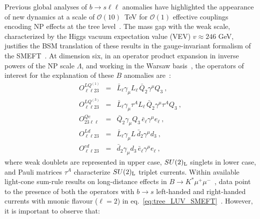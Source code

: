 Previous global analyses of $b \to s \ell \ell$ anomalies have highlighted the appearance of new dynamics at a scale of $\mathcal{O}(10)$~TeV for $\mathcal{O}(1)$ effective couplings encoding NP effects at the tree level~\cite{DAmico:2017mtc,Geng:2017svp,Capdevila:2017bsm,Ciuchini:2017mik,Hiller:2017bzc}. The mass gap with the weak scale, characterized by the Higgs vacuum expectation value (VEV) $v \approx 246$ GeV, justifies the BSM translation of these results in the gauge-invariant formalism of the SMEFT~\cite{Buchmuller:1985jz,Grzadkowski:2010es}. At dimension six, in an operator product expansion in inverse powers of the NP scale $\Lambda$, and working in the Warsaw basis~\cite{Grzadkowski:2010es}, the operators of interest for the explanation of these $B$ anomalies are~\cite{Celis:2017doq,Ciuchini:2019usw,Aebischer:2019mlg}: 
\begin{eqnarray}
	\label{eq:tree_LUV_SMEFT}
	O^{LQ^{(1)}}_{\ell \ell 23} & = & \bar{L}_{\ell} \gamma_{\mu}  L_{\ell} \, \bar{Q}_{2} \gamma^{\mu}  Q_{3} \ , \nonumber \\
	O^{LQ^{(3)}}_{\ell \ell 23} & = & \bar{L}_{\ell} \gamma_{\mu} \tau^{A} L_{\ell} \, \bar{Q}_{2} \gamma^{\mu} \tau^{A} Q_{3} \ , \nonumber \\
	O^{Qe}_{23 \ell \ell} & = & \bar{Q}_{2} \gamma_{\mu} Q_{3} \, \bar{e}_{\ell} \gamma^{\mu}  e_{\ell} \ ,\nonumber \\
	O^{Ld}_{ \ell \ell 23} & = & \bar{L}_{\ell} \gamma_{\mu} L \, \bar{d}_{2} \gamma^{\mu} d_{3} \ , \\
	O^{ed}_{\ell \ell 23 } & = & \bar{d}_{2} \gamma_{\mu} d_{3} \, \bar{e}_{\ell} \gamma^{\mu}  e_{\ell} \ ,\nonumber
\end{eqnarray}
where weak doublets are represented in upper case, $SU(2)_{\rm L}$ singlets in lower case, and Pauli matrices $\tau^{A}$ characterize $SU(2)_{\rm L}$ triplet currents. Within available light-cone sum-rule results on long-distance effects in $B \to K^{*} \mu^{+} \mu^{-}$~\cite{Khodjamirian:2010vf,Bobeth:2017vxj}, data point to the presence of both the operators with $b \to s$ left-handed and right-handed currents with muonic flavour ($\ell = 2$) in eq.~\eqref{eq:tree_LUV_SMEFT}~\cite{Ciuchini:2019usw,Alok:2019ufo,Alguero:2019ptt,Kowalska:2019ley}. However, it is important to observe that: 
